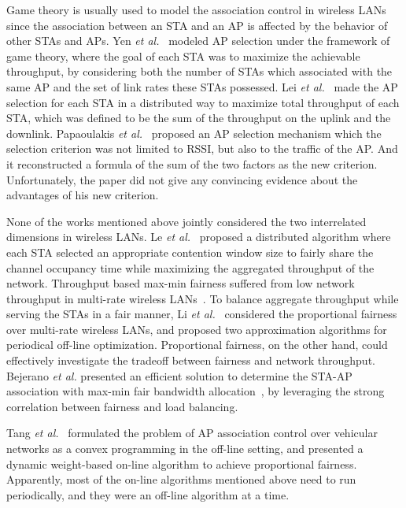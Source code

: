 \documentclass[conference]{IEEEtran}
\begin{document}
  Game theory is usually used to model the association control in wireless LANs since the association between an STA and an AP is affected by the behavior of other STAs and APs.  Yen \textit{et al.}~\cite{Yen:2011} modeled AP selection under the framework of game theory, where the goal of each STA was to maximize the achievable throughput, by considering both the number of STAs which associated with the same AP and the set of link rates these STAs possessed. Lei \textit{et al.}~\cite{lei2017fairness} made the AP selection for each STA in a distributed way to maximize total throughput of each STA, which was defined to be the sum of the throughput on the uplink and the downlink. Papaoulakis \textit{et al.}~\cite{Papaoulakis:2008} proposed an AP selection mechanism which the selection criterion was not limited to RSSI, but also to the traffic of the AP.  And it reconstructed a formula of the sum of the two factors as the new criterion.  Unfortunately, the paper did not give any convincing evidence about the advantages of his new criterion.



  None of the works mentioned above jointly considered the two interrelated dimensions in wireless LANs. Le \textit{et al.}~\cite{le2012maximizing} proposed a distributed algorithm where each STA selected an appropriate contention window size to fairly share the channel occupancy time while maximizing the aggregated throughput of the network.  Throughput based max-min fairness suffered from low network throughput in multi-rate wireless LANs~\cite{Bejerano:2004}.  To balance aggregate throughput while serving the STAs in a fair manner, Li \textit{et al.}~\cite{Li:2008} considered the proportional fairness over multi-rate wireless LANs, and proposed two approximation algorithms for periodical off-line optimization.  Proportional fairness, on the other hand, could effectively investigate the tradeoff between fairness and network throughput.  Bejerano \textit{et al.} presented an efficient solution to determine the STA-AP association with max-min fair bandwidth allocation~\cite{Bejerano:2004}, by leveraging the strong correlation between fairness and load balancing.

  Tang \textit{et al.}~\cite{Tang2016Throughput} formulated the problem of AP association control over vehicular networks as a convex programming in the off-line setting, and presented a dynamic weight-based on-line algorithm to achieve proportional fairness.  Apparently, most of the on-line algorithms mentioned above need to run periodically, and they were an off-line algorithm at a time.
\end{document}
